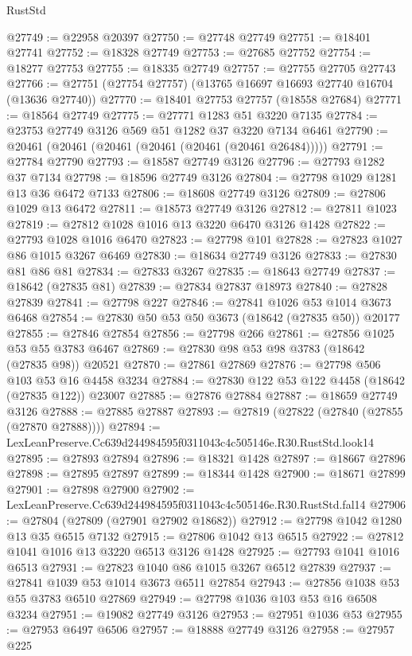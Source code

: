 \begin{lexlean}{RustStd}
\begin{coremodule}
@27749 := @22958 @20397
@27750 := @27748 @27749
@27751 := @18401 @27741
@27752 := @18328 @27749
@27753 := @27685 @27752
@27754 := @18277 @27753
@27755 := @18335 @27749
@27757 := @27755 @27705 @27743
@27766 := @27751 (@27754 @27757) (@13765 @16697 @16693 @27740 @16704 (@13636 @27740))
@27770 := @18401 @27753 @27757 (@18558 @27684)
@27771 := @18564 @27749
@27775 := @27771 @1283 @51 @3220 @7135
@27784 := @23753 @27749 @3126 @569 @51 @1282 @37 @3220 @7134 @6461
@27790 := @20461 (@20461 (@20461 (@20461 (@20461 (@20461 @26484)))))
@27791 := @27784 @27790
@27793 := @18587 @27749 @3126
@27796 := @27793 @1282 @37 @7134
@27798 := @18596 @27749 @3126
@27804 := @27798 @1029 @1281 @13 @36 @6472 @7133
@27806 := @18608 @27749 @3126
@27809 := @27806 @1029 @13 @6472
@27811 := @18573 @27749 @3126
@27812 := @27811 @1023
@27819 := @27812 @1028 @1016 @13 @3220 @6470 @3126 @1428
@27822 := @27793 @1028 @1016 @6470
@27823 := @27798 @101
@27828 := @27823 @1027 @86 @1015 @3267 @6469
@27830 := @18634 @27749 @3126
@27833 := @27830 @81 @86 @81
@27834 := @27833 @3267
@27835 := @18643 @27749
@27837 := @18642 (@27835 @81)
@27839 := @27834 @27837 @18973
@27840 := @27828 @27839
@27841 := @27798 @227
@27846 := @27841 @1026 @53 @1014 @3673 @6468
@27854 := @27830 @50 @53 @50 @3673 (@18642 (@27835 @50)) @20177
@27855 := @27846 @27854
@27856 := @27798 @266
@27861 := @27856 @1025 @53 @55 @3783 @6467
@27869 := @27830 @98 @53 @98 @3783 (@18642 (@27835 @98)) @20521
@27870 := @27861 @27869
@27876 := @27798 @506 @103 @53 @16 @4458 @3234
@27884 := @27830 @122 @53 @122 @4458 (@18642 (@27835 @122)) @23007
@27885 := @27876 @27884
@27887 := @18659 @27749 @3126
@27888 := @27885 @27887
@27893 := @27819 (@27822 (@27840 (@27855 (@27870 @27888))))
@27894 := LexLeanPreserve.Cc639d244984595f0311043c4c505146e.R30.RustStd.look14
@27895 := @27893 @27894
@27896 := @18321 @1428
@27897 := @18667 @27896
@27898 := @27895 @27897
@27899 := @18344 @1428
@27900 := @18671 @27899
@27901 := @27898 @27900
@27902 := LexLeanPreserve.Cc639d244984595f0311043c4c505146e.R30.RustStd.fal14
@27906 := @27804 (@27809 (@27901 @27902 @18682))
@27912 := @27798 @1042 @1280 @13 @35 @6515 @7132
@27915 := @27806 @1042 @13 @6515
@27922 := @27812 @1041 @1016 @13 @3220 @6513 @3126 @1428
@27925 := @27793 @1041 @1016 @6513
@27931 := @27823 @1040 @86 @1015 @3267 @6512 @27839
@27937 := @27841 @1039 @53 @1014 @3673 @6511 @27854
@27943 := @27856 @1038 @53 @55 @3783 @6510 @27869
@27949 := @27798 @1036 @103 @53 @16 @6508 @3234
@27951 := @19082 @27749 @3126
@27953 := @27951 @1036 @53
@27955 := @27953 @6497 @6506
@27957 := @18888 @27749 @3126
@27958 := @27957 @225

\end{coremodule}
\end{lexlean}
